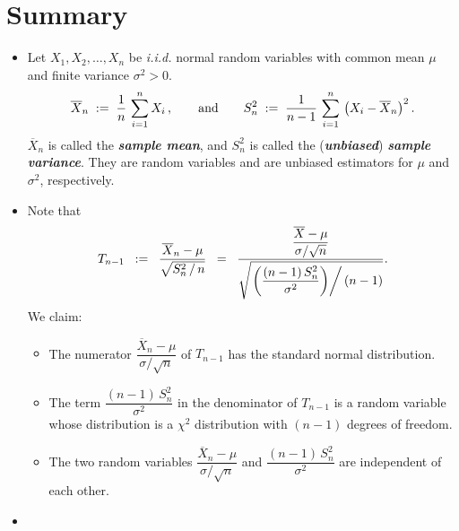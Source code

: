 \documentclass{article}
\begin{document}

\section{Summary}
\setcounter{theorem}{0}

\begin{itemize}
\item  Let $X_{1}, X_{2}, \ldots, X_{n}$ be \emph{i.i.d.} normal random variables
          with common mean $\mu$ and finite variance $\sigma^{2} > 0$.
          \begin{equation*}
          \overline{X}_{n} \; := \; \dfrac{1}{n}\,\sum_{i=1}^{n}X_{i}\,,
          \quad\quad\textnormal{and}\quad\quad
          S_{n}^{2} \; := \; \dfrac{1}{n-1}\,\sum_{i=1}^{n}\,\left(X_{i}-\overline{X}_{n}\right)^{2}.
          \end{equation*}
          $\overline{X}_{n}$ is called the \textbf{\emph{sample mean}}, and $S_{n}^{2}$ is called the
          (\textbf{\emph{unbiased}}) \textbf{\emph{sample variance}}.
          They are random variables and are unbiased estimators for $\mu$ and $\sigma^{2}$, respectively.
\item  Note that
          \begin{equation*}
          T_{n-1}
          \;\;:=\;\; \dfrac{\overline{X}_{n} - \mu}{\sqrt{S_{n}^{2}\,/\,n}}
          \;\; =\;\; \dfrac{\dfrac{\overline{X}-\mu}{\sigma/\sqrt{n}}}
                      {\sqrt{\left.\left(\dfrac{(n-1)\,S_{n}^{2}}{\sigma^{2}}\right)\right/(n-1)}}.
          \end{equation*}
          We claim:
          \begin{itemize}
          \item  The numerator $\dfrac{\overline{X}_{n}-\mu}{\sigma/\sqrt{n}}$ of $T_{n-1}$
                    has the standard normal distribution.
          \item  The term $\dfrac{(n-1)\,S_{n}^{2}}{\sigma^{2}}$ in the denominator of $T_{n-1}$
                    is a random variable whose distribution is a $\chi^{2}$ distribution
                    with $(n-1)$ degrees of freedom.
          \item  The two random  variables $\dfrac{\overline{X}_{n}-\mu}{\sigma/\sqrt{n}}$ and
                    $\dfrac{(n-1)\,S_{n}^{2}}{\sigma^{2}}$ are independent of each other.
          \end{itemize}
\item  \begin{definition}\mbox{}\\

\end{definition}
\end{itemize}
\end{document}

